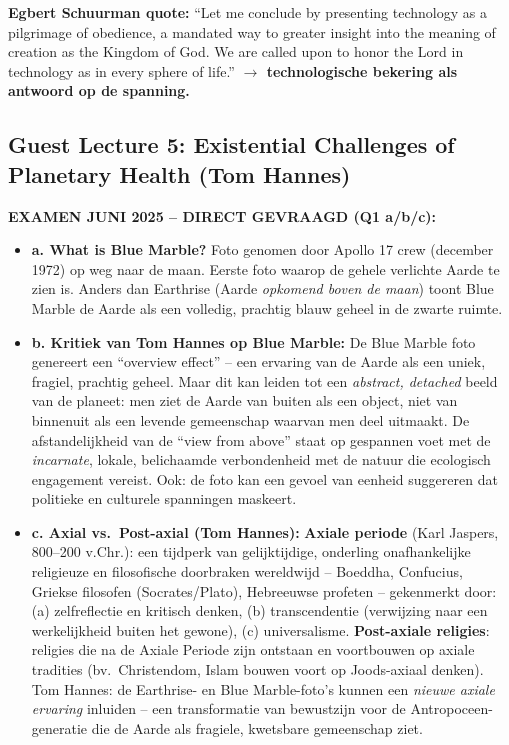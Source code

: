 \documentclass[a4paper,10pt]{article}
\begin{document}
\textbf{Egbert Schuurman quote:} ``Let me conclude by presenting technology as a pilgrimage of obedience, a mandated way to greater insight into the meaning of creation as the Kingdom of God. We are called upon to honor the Lord in technology as in every sphere of life.''\textbf{ $\to$ technologische bekering als antwoord op de spanning.}

\subsection{Guest Lecture 5: Existential Challenges of Planetary Health (Tom Hannes)}
\begin{exambox}
\textbf{EXAMEN JUNI 2025 -- DIRECT GEVRAAGD (Q1 a/b/c):}
\begin{itemize}[noitemsep]
  \item \textbf{a. What is Blue Marble?} Foto genomen door Apollo 17 crew (december 1972) op weg naar de maan. Eerste foto waarop de gehele verlichte Aarde te zien is. Anders dan Earthrise (Aarde \textit{opkomend boven de maan}) toont Blue Marble de Aarde als een volledig, prachtig blauw geheel in de zwarte ruimte.
  \item \textbf{b. Kritiek van Tom Hannes op Blue Marble:} De Blue Marble foto genereert een ``overview effect'' -- een ervaring van de Aarde als een uniek, fragiel, prachtig geheel. Maar dit kan leiden tot een \textit{abstract, detached} beeld van de planeet: men ziet de Aarde van buiten als een object, niet van binnenuit als een levende gemeenschap waarvan men deel uitmaakt. De afstandelijkheid van de ``view from above'' staat op gespannen voet met de \textit{incarnate}, lokale, belichaamde verbondenheid met de natuur die ecologisch engagement vereist. Ook: de foto kan een gevoel van eenheid suggereren dat politieke en culturele spanningen maskeert.
  \item \textbf{c. Axial vs.\ Post-axial (Tom Hannes):} \textbf{Axiale periode} (Karl Jaspers, 800--200 v.Chr.): een tijdperk van gelijktijdige, onderling onafhankelijke religieuze en filosofische doorbraken wereldwijd -- Boeddha, Confucius, Griekse filosofen (Socrates/Plato), Hebreeuwse profeten -- gekenmerkt door: (a) zelfreflectie en kritisch denken, (b) transcendentie (verwijzing naar een werkelijkheid buiten het gewone), (c) universalisme. \textbf{Post-axiale religies}: religies die na de Axiale Periode zijn ontstaan en voortbouwen op axiale tradities (bv.\ Christendom, Islam bouwen voort op Joods-axiaal denken). Tom Hannes: de Earthrise- en Blue Marble-foto's kunnen een \textit{nieuwe axiale ervaring} inluiden -- een transformatie van bewustzijn voor de Antropoceen-generatie die de Aarde als fragiele, kwetsbare gemeenschap ziet.
\end{itemize}
\end{exambox}
\end{document}
